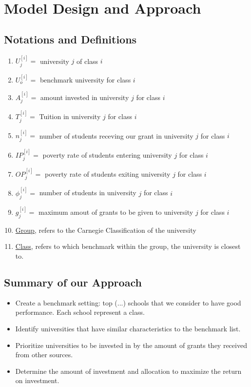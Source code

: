 \documentclass[12pt]{scrartcl}
\begin{document}
\section{Model Design and Approach}
	\subsection{Notations and Definitions}
	\begin{enumerate}
		\item $U_j^{[i]} = $ university $j$ of class $i$
		\item $U_o^{[i]} = $ benchmark university for class $i$
		\item $A_j^{[i]} = $ amount invested in university $j$ for class $i$
		\item $T_j^{[i]} = $ Tuition in university $j$ for class $i$
		\item $n_j^{[i]} = $ number of students receving our grant in university $j$ for class $i$
		\item $IP_j^{[i]} = $ poverty rate of students entering university $j$ for class $i$
		\item $OP_j^{[i]} = $ poverty rate of students exiting university $j$ for class $i$
		\item $\phi_j^{[i]} = $ number of students in university $j$ for class $i$
		\item $g_j^{[i]} = $ maximum amout of grants to be given to university $j$ for class $i$
		\item \underline{Group}, refers to the Carnegie Classification of the university
		\item \underline{Class}, refers to which benchmark within the group, the university is closest to.
	\end{enumerate}
	
	\subsection{Summary of our Approach}
		\begin{itemize}
		\item Create a benchmark setting: top (...) schools that we consider to have good performance. Each school represent a class.  
		\item Identify universities that have similar characteristics to the benchmark list. 
		\item Prioritize universities to be invested in by the amount of grants they received from other sources.
		\item Determine the amount of investment and allocation to maximize the return on investment. 
		\end{itemize}
				 
\end{document}
